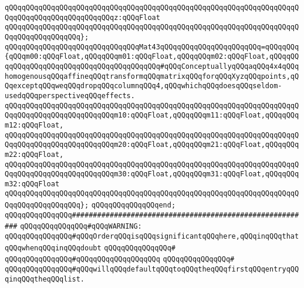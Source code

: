 \verb|qQQqqQQqqQQqqQQqqQQqqQQqqQQqqQQqqQQqqQQqqQQqqQQqqQQqqQQqqQQqqQQqqQQqqQQqqQQqqQQqqQQqqQQqqQQqqQQqz:qQQqFloat|\newline
\verb|qQQqqQQqqQQqqQQqqQQqqQQqqQQqqQQqqQQqqQQqqQQqqQQqqQQqqQQqqQQqqQQqqQQqqQQqqQQqqQQqqQQqqQQq};|\newline
\verb|qQQqqQQqqQQqqQQqqQQqqQQqqQQqqQQqMat43qQQqqQQqqQQqqQQqqQQqqQQq=qQQqqQQq{qQQqm00:qQQqFloat,qQQqqQQqm01:qQQqFloat,qQQqqQQqm02:qQQqFloat,qQQqqQQqqQQqqQQqqQQqqQQqqQQqqQQqqQQqqQQqqQQq#qQQqConceptuallyqQQqaqQQq4x4qQQqhomogenousqQQqaffineqQQqtransformqQQqmatrixqQQqforqQQqXyzqQQqpoints,qQQqexceptqQQqweqQQqdropqQQqcolumnqQQq4,qQQqwhichqQQqdoesqQQqseldom-usedqQQqperspectiveqQQqeffects.|\newline
\verb|qQQqqQQqqQQqqQQqqQQqqQQqqQQqqQQqqQQqqQQqqQQqqQQqqQQqqQQqqQQqqQQqqQQqqQQqqQQqqQQqqQQqqQQqqQQqqQQqm10:qQQqFloat,qQQqqQQqm11:qQQqFloat,qQQqqQQqm12:qQQqFloat,|\newline
\verb|qQQqqQQqqQQqqQQqqQQqqQQqqQQqqQQqqQQqqQQqqQQqqQQqqQQqqQQqqQQqqQQqqQQqqQQqqQQqqQQqqQQqqQQqqQQqqQQqm20:qQQqFloat,qQQqqQQqm21:qQQqFloat,qQQqqQQqm22:qQQqFloat,|\newline
\verb|qQQqqQQqqQQqqQQqqQQqqQQqqQQqqQQqqQQqqQQqqQQqqQQqqQQqqQQqqQQqqQQqqQQqqQQqqQQqqQQqqQQqqQQqqQQqqQQqm30:qQQqFloat,qQQqqQQqm31:qQQqFloat,qQQqqQQqm32:qQQqFloat|\newline
\verb|qQQqqQQqqQQqqQQqqQQqqQQqqQQqqQQqqQQqqQQqqQQqqQQqqQQqqQQqqQQqqQQqqQQqqQQqqQQqqQQqqQQqqQQq};|\newline
\verb|qQQqqQQqqQQqqQQqend;|\newline
\newline
\newline
\newline
\newline
\verb|qQQqqQQqqQQqqQQq#########################################################|\newline
\verb|qQQqqQQqqQQqqQQq#qQQqWARNING:|\newline
\verb|qQQqqQQqqQQqqQQq#qQQqOrderqQQqisqQQqsignificantqQQqhere,qQQqinqQQqthatqQQqwhenqQQqinqQQqdoubt|\newline
\verb|qQQqqQQqqQQqqQQq#|\newline
\verb|qQQqqQQqqQQqqQQq#qQQqqQQqqQQqqQQqqQQq|\newline
\verb|qQQqqQQqqQQqqQQq#|\newline
\verb|qQQqqQQqqQQqqQQq#qQQqwillqQQqdefaultqQQqtoqQQqtheqQQqfirstqQQqentryqQQqinqQQqtheqQQqlist.|\newline
